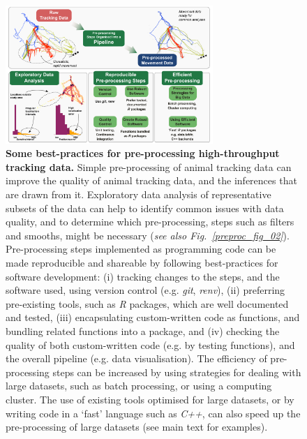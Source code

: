     \begin{figure}
        \centering
        \includegraphics[width=0.7\textwidth]{figures/preprocessing/fig_01.png}
        \caption{
            \textbf{Some best-practices for pre-processing high-throughput tracking data.}
            Simple pre-processing of animal tracking data can improve the quality of animal tracking data, and the inferences that are drawn from it.
            Exploratory data analysis of representative subsets of the data can help to identify common issues with data quality, and to determine which pre-processing, steps such as filters and smooths, might be necessary (\textit{see also Fig.~\ref{preproc_fig_02}}).
            Pre-processing steps implemented as programming code can be made reproducible and shareable by following best-practices for software development: (i) tracking changes to the steps, and the software used, using version control (e.g. \textit{git}, \textit{renv}), (ii) preferring pre-existing tools, such as \textit{R} packages, which are well documented and tested, (iii) encapsulating custom-written code as functions, and bundling related functions into a package, and (iv) checking the quality of both custom-written code (e.g. by testing functions), and the overall pipeline (e.g. data visualisation).
            The efficiency of pre-processing steps can be increased by using strategies for dealing with large datasets, such as batch processing, or using a computing cluster.
            The use of existing tools optimised for large datasets, or by writing code in a `fast' language such as \textit{C++}, can also speed up the pre-processing of large datasets (see main text for examples).
        }
        \label{preproc_fig_01}
    \end{figure}

